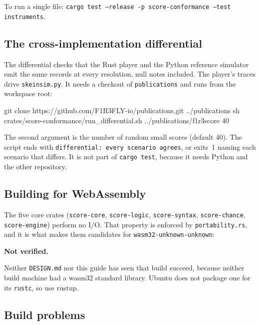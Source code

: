 \documentclass[11pt,a4paper]{article}
\newcommand{\ttx}[1]{\texttt{#1}}
\newenvironment{caveat}[1]{\par\medskip\noindent\colorbox{notebg}{\parbox{\dimexpr\linewidth-2\fboxsep}{\small\textbf{#1.}\ }}\par\nopagebreak\begingroup\small}{\endgroup\par\medskip}
\begin{document}
\noindent To run a single file: \ttx{cargo test --release -p score-conformance
--test instruments}.

\subsection{The cross-implementation differential}\label{ssec:differential}

The differential checks that the Rust player and the Python reference simulator
emit the same records at every resolution, null notes included. The player's
traces drive \ttx{skeinsim.py}. It needs a checkout of \ttx{publications} and
runs from the workspace root:

\begin{shell}
git clone https://github.com/F1R3FLY-io/publications.git ../publications
sh crates/score-conformance/run_differential.sh ../publications/f1r3score 40
\end{shell}

\noindent The second argument is the number of random small scores (default
40). The script ends with \ttx{differential: every scenario agrees}, or exits~1
naming each scenario that differs. It is not part of \ttx{cargo test}, because
it needs Python and the other repository.

\subsection{Building for WebAssembly}\label{ssec:wasm}

The five core crates (\ttx{score-core}, \ttx{score-logic}, \ttx{score-syntax},
\ttx{score-chance}, \ttx{score-engine}) perform no I/O. That property is
enforced by \ttx{portability.rs}, and it is what makes them candidates for
\ttx{wasm32-unknown-unknown}:


\begin{caveat}{Not verified}
Neither \ttx{DESIGN.md} nor this guide has seen that build succeed, because
neither build machine had a wasm32 standard library. Ubuntu does not package
one for its \ttx{rustc}, so use rustup.
\end{caveat}

\subsection{Build problems}
\end{document}
